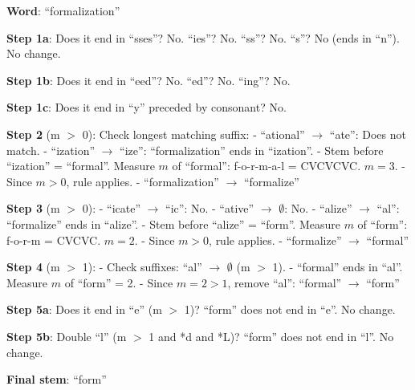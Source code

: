 \documentclass[11pt,a4paper]{article}
\begin{document}
\begin{tcolorbox}[colback=green!5!white,colframe=green!75!black,title=\textbf{Worked Example 31: Porter Stemmer on ``formalization''}]
\textbf{Word}: ``formalization''

\textbf{Step 1a}: Does it end in ``sses''? No. ``ies''? No. ``ss''? No. ``s''? No (ends in ``n''). No change.

\textbf{Step 1b}: Does it end in ``eed''? No. ``ed''? No. ``ing''? No.

\textbf{Step 1c}: Does it end in ``y'' preceded by consonant? No.

\textbf{Step 2} (m $>$ 0): Check longest matching suffix:
- ``ational'' $\to$ ``ate'': Does not match.
- ``ization'' $\to$ ``ize'': ``formalization'' ends in ``ization''.
- Stem before ``ization'' = ``formal''. Measure $m$ of ``formal'': f-o-r-m-a-l = CVCVCVC. $m = 3$.
- Since $m > 0$, rule applies.
- ``formalization'' $\to$ ``formalize''

\textbf{Step 3} (m $>$ 0):
- ``icate'' $\to$ ``ic'': No.
- ``ative'' $\to$ $\emptyset$: No.
- ``alize'' $\to$ ``al'': ``formalize'' ends in ``alize''.
- Stem before ``alize'' = ``form''. Measure $m$ of ``form'': f-o-r-m = CVCVC. $m = 2$.
- Since $m > 0$, rule applies.
- ``formalize'' $\to$ ``formal''

\textbf{Step 4} (m $>$ 1):
- Check suffixes: ``al'' $\to$ $\emptyset$ (m $>$ 1).
- ``formal'' ends in ``al''. Measure $m$ of ``form'' = 2.
- Since $m = 2 > 1$, remove ``al'': ``formal'' $\to$ ``form''

\textbf{Step 5a}: Does it end in ``e'' (m $>$ 1)? ``form'' does not end in ``e''. No change.

\textbf{Step 5b}: Double ``l'' (m $>$ 1 and *d and *L)? ``form'' does not end in ``l''. No change.

\textbf{Final stem}: ``form''
\end{tcolorbox}
\end{document}
